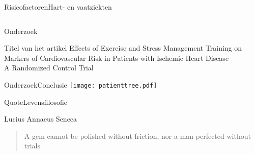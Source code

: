 \documentclass{beamer}
\begin{document}
\begin{frame}{Risicofactoren}{Hart- en vaatziekten}
    \begin{columns}
\end{columns}
\end{frame}
\begin{frame}{Onderzoek}
    \begin{block}{Titel van het artikel}
        Effects of Exercise and Stress Management Training on Markers of Cardiovascular Risk in Patients with Ischemic Heart Disease\\
        A Randomized Control Trial
    \end{block}
\end{frame}
\begin{frame}{Onderzoek}{Conclusie}
    \texttt{[image: patienttree.pdf]}
\end{frame}
\begin{frame}{Quote}{Levensfilosofie}
    \begin{block}{Lucius Annaeus Seneca}
    \begin{quote}
        A gem cannot be polished without friction, nor a man perfected without trials
    \end{quote}
\end{block}
\end{frame}

{\aauwavesbg
\begin{frame}
\end{frame}}
\end{document}
